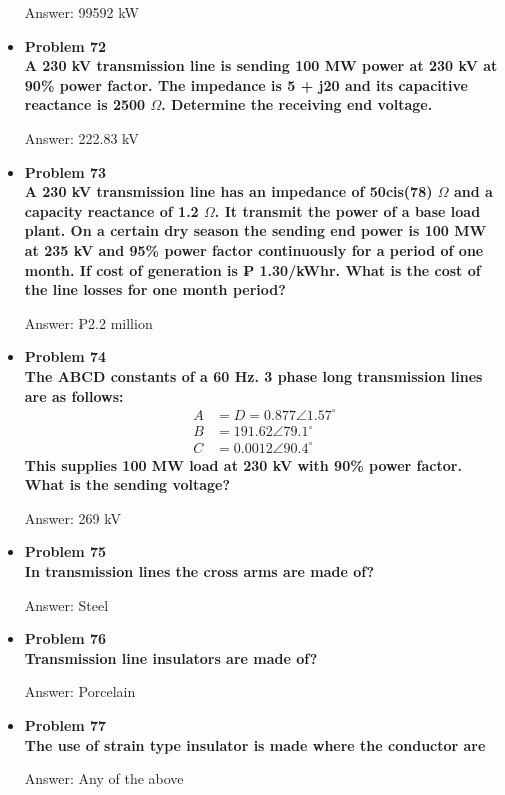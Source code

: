 \documentclass{article}
\begin{document}
\begin{center}
\begin{itemize}
    Answer: 99592 kW

    \item\textbf{Problem 72\\%
    A 230 kV transmission line is sending 100 MW power at 230 kV at 90\% power factor. The impedance is 5 + j20 and its capacitive reactance is 2500 $\Omega$. Determine the receiving end voltage.}

    Answer: 222.83 kV

    \item\textbf{Problem 73\\%
    A 230 kV transmission line has an impedance of 50cis(78) $\Omega$ and a capacity reactance of 1.2 $\Omega$. It transmit the power of a base load plant. On a certain dry season the sending end power is 100 MW at 235 kV and 95\% power factor continuously for a period of one month. If cost of generation is ₱ 1.30/kWhr. What is the cost of the line losses for one month period?}

    Answer: ₱2.2 million

    \item\textbf{Problem 74\\%
    The ABCD constants of a 60 Hz. 3 phase long transmission lines are as follows:}    
        \begin{align}
            A &= D = 0.877\angle 1.57^{\circ}\\
            B &= 191.62\angle 79.1^{\circ}\\
            C &= 0.0012\angle 90.4^{\circ}
        \end{align}
    \textbf{This supplies 100 MW load at 230 kV with 90\% power factor. What is the sending voltage?}

     Answer: 269 kV

    \item\textbf{Problem 75\\%
    In transmission lines the cross arms are made of?}

    Answer: Steel

    \item\textbf{Problem 76\\%
    Transmission line insulators are made of?}

    Answer: Porcelain

    \item\textbf{Problem 77\\%
    The use of strain type insulator is made where the conductor are}

    Answer: Any of the above


\end{itemize}
\end{center}
\end{document}
